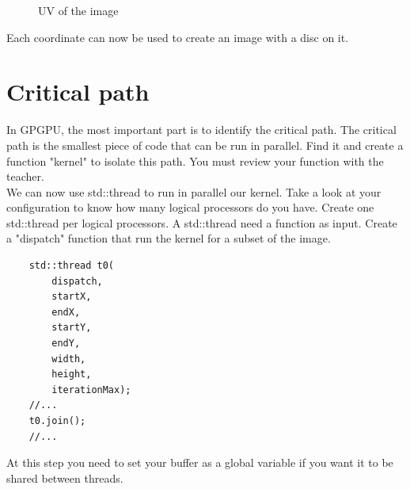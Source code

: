 \documentclass{article}
\begin{document}
\begin{figure}[H]
	\centering
	\caption{UV of the image}
\end{figure}

Each coordinate can now be used to create an image with a disc on it.

\section{Critical path}
In GPGPU, the most important part is to identify the critical path. The critical path is the smallest piece of code that can be run in parallel. Find it and create a function "kernel" to isolate this path. You must review your function with the teacher.\\
We can now use std::thread to run in parallel our kernel. Take a look at your configuration to know how many logical processors do you have. Create one std::thread per logical processors. A std::thread need a function as input. Create a "dispatch" function that run the kernel for a subset of the image. 
\begin{lstlisting}
	std::thread t0(
		dispatch,
		startX,
		endX,
		startY,
		endY,
		width,
		height,
		iterationMax);
	//...
	t0.join();
	//...
\end{lstlisting}
At this step you need to set your buffer as a global variable if you want it to be shared between threads.
\end{document}

